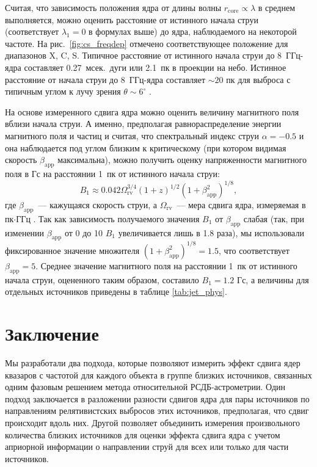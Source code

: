 Считая, что зависимость положения ядра от длины волны $r_\text{core} \propto \lambda$ в среднем
выполняется, можно оценить расстояние от истинного начала струи (соответствует $\lambda_1 = 0$ в
формулах выше) до ядра, наблюдаемого на некоторой частоте. На рис.~\ref{fig:cs_freqdep} отмечено
соответствующее положение для диапазонов X, C, S. Типичное расстояние от истинного начала
струи до 8~ГГц-ядра составляет 0.27~мсек.~дуги или 2.1~пк в проекции на небо. Истинное расстояние
от начала струи до 8~ГГц-ядра составляет $\sim 20$ пк для выброса с типичным углом к лучу зрения
$\theta \sim 6^\circ$ \cite{Hovatta2009}.

На основе измеренного сдвига ядра можно оценить величину магнитного поля вблизи начала струи. А
именно, предполагая равнораспределение энергии магнитного поля и частиц и считая, что спектральный
индекс струи $\alpha=-0.5$ и она наблюдается под углом близким
к критическому (при котором видимая скорость $\beta_\text{app}$ максимальна), можно получить
оценку напряженности магнитного поля в Гс на расстоянии 1~пк от истинного начала струи:
\begin{equation}
B_1 \approx 0.042 \Omega_\text{rv}^{3/4} (1+z)^{1/2} (1+\beta_\text{app}^2)^{1/8},
\label{eq:b1}
\end{equation}
где $\beta_\text{app}$~--- кажущаяся скорость струи, а $\Omega_\text{rv}$~--- мера сдвига ядра,
измеряемая в пк$\cdot$ГГц \cite{Pushkarev_2012}.
Так как зависимость получаемого значения $B_1$ от $\beta_\text{app}$ слабая (так, при изменении
$\beta_\text{app}$ от 0 до 10 $B_1$ увеличивается лишь в 1.8 раза), мы использовали фиксированное
значение множителя $(1+\beta_\text{app}^2)^{1/8} = 1.5$, что соответствует $\beta_\text{app}
= 5$. Среднее значение магнитного поля на расстоянии 1~пк от истинного начала струи, оцененного
таким образом, составило $B_1 = 1.2$ Гс, а величины для отдельных источников приведены в таблице
\ref{tab:jet_phys}.


\section{Заключение}

Мы разработали два подхода, которые позволяют измерить эффект сдвига ядер квазаров с частотой для
каждого объекта в группе близких источников, связанных одним фазовым решением метода относительной
РСДБ-астрометрии. Один подход заключается в разложении разности сдвигов ядра для пары источников по
направлениям релятивистских выбросов этих источников, предполагая, что сдвиг происходит вдоль них.
Другой позволяет объединить измерения произвольного количества близких источников для оценки эффекта
сдвига ядра с учетом априорной информации о направлении струй для всех или только для части
источников.

